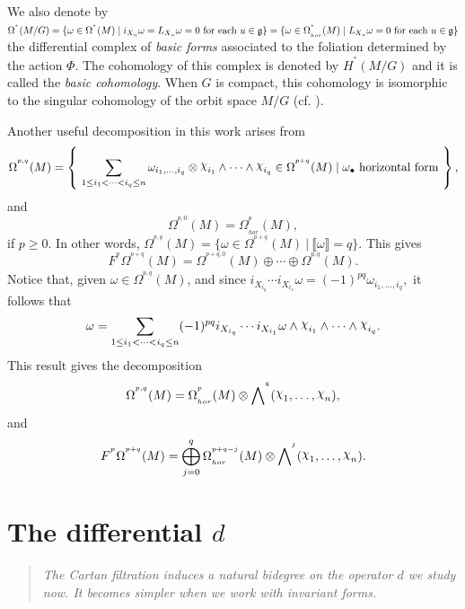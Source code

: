 \documentclass[a4paper,oneside,10pt,reqno]{amsart}
\theoremstyle{definition}
\newcommand{\g}{\noindent {\mathfrak{g}}}
\newcommand{\tq}{\ \big| \ }
\newcommand\chii{\raise2pt\hbox{$\chi$}}
\newcommand\Om{\Omega}
\newcommand\om{\omega}
\newcommand{\bi}[2]{{#1}^{^{#2}}}
\newcommand{\lau}[4]{{#1}^{^{#2}}_{_{#3}}{\left( #4 \right)}}
\newcommand{\coho}[3]{{#1}^{^{#2}}{\left( #3 \right)}}
\begin{document}
 We also denote by $\coho \Om *{M/G} = \{ \om \in \coho \Om * M \mid i_{X_u} \omega = L_{X_u} \omega =0 \hbox{ for each } u\in \g \} =   \{ \om \in \lau \Om * {hor} M \mid  L_{X_u} \omega =0 \hbox{ for each } u\in \g \}$ the differential complex of \emph{basic forms} associated to the foliation determined by the action $\Phi$. The cohomology of this complex is denoted by
$\coho H *{M/G}$  and it is called the \emph{basic cohomology}.
When $G$ is compact, this cohomology is isomorphic to the singular cohomology of the orbit space $M/G$ (cf. \cite{MR958087}).


\bigskip
Another useful decomposition in this work arises from 
$$
\coho \Om{p,q} M = \left\{  \ \sum_{1\leq i_1 < \cdots < i_q\leq n } \om_{i_1, \ldots,i_q}  \otimes \chii_{i_1} \wedge \cdots \wedge \chii_{i_q}  \in \coho \Om {p+q} M \mid \om_\bullet \hbox{ horizontal form } \right\},
$$
 and
$$
\coho \Om{p,0} M = \lau \Om p {hor} M,
$$
if $p\geq 0$.
In other words,
$
\coho \Om{p,q} M = \{ \omega \in \coho \Omega {p+q} M \tq \llbracket \omega\rrbracket  =q\}$.
This gives 
\begin{equation}\label{bideg}
\bi{F}{p}\lau{\Om}{p+q}{}{M}  = \coho \Om{p+q,0} M  \oplus \cdots \oplus \coho \Om{p,q} M .
\end{equation}
Notice that, given  $\omega \in \coho \Om{p,q} M $, and since 
$
i_{X_{i_q}} \cdots i_{X_{i_1}} \om = (-1)^{pq} \om_{i_1, \ldots,i_q} ,
$
it follows that
\begin{equation*}\label{Opq}
\om = \sum_{1\leq i_1 < \cdots < i_q\leq n } (-1)^{pq} i_{X_{i_q}} \cdots i_{X_{i_1}} \om  \wedge \chii_{i_1} \wedge \cdots \wedge \chii_{i_q}.
\end{equation*}
This result gives the decomposition
\begin{equation*}\label{iden2}
\coho  \Om{p,q} M = \lau \Om p{hor} M \otimes \bi \bigwedge q(\chii_1, \ldots,\chii_n),
\end{equation*}
and
\begin{equation*}\label{iden3}
\bi{F}{p}\lau{\Om}{p+q}{}{M}  = \bigoplus_{j=0}^q \lau \Om {p+q-j} {hor} M \otimes \bi \bigwedge j(\chii_1, \ldots,\chii_n).
\end{equation*}



\section{The differential $d$}
\begin{quote}
 \emph{The Cartan filtration induces a natural bidegree on the operator $d$ we study now. It becomes simpler when we work with invariant forms.}
 \end{quote}
\end{document}
